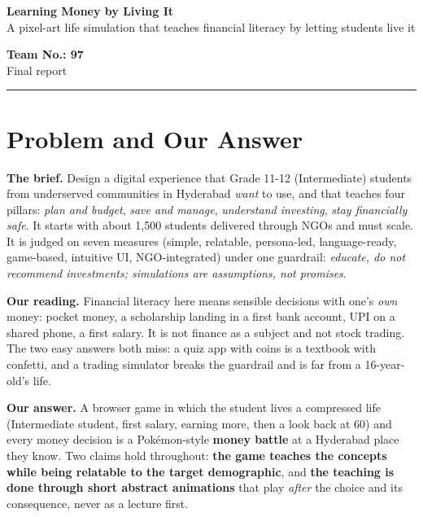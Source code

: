 \documentclass[10pt,a4paper]{article}
\begin{document}
\begin{minipage}[t]{0.70\textwidth}
{\LARGE\bfseries Learning Money by Living It}\\[1pt]
{\color{muted}A pixel-art life simulation that teaches financial literacy by letting students live it}
\end{minipage}\hfill
\begin{minipage}[t]{0.28\textwidth}\raggedleft
{\bfseries Team No.: 97}\\[1pt]
{\small\color{muted}Final report}
\end{minipage}

\vspace{3pt}
{\color{acc}\rule{\textwidth}{1.2pt}}
\vspace{-3pt}

\section{Problem and Our Answer}
\textbf{The brief.} Design a digital experience that Grade 11-12 (Intermediate) students from underserved communities in Hyderabad \emph{want} to use, and that teaches four pillars: \emph{plan and budget}, \emph{save and manage}, \emph{understand investing}, \emph{stay financially safe}. It starts with about 1,500 students delivered through NGOs and must scale. It is judged on seven measures (simple, relatable, persona-led, language-ready, game-based, intuitive UI, NGO-integrated) under one guardrail: \emph{educate, do not recommend investments; simulations are assumptions, not promises}.

\textbf{Our reading.} Financial literacy here means sensible decisions with one's \emph{own} money: pocket money, a scholarship landing in a first bank account, UPI on a shared phone, a first salary. It is not finance as a subject and not stock trading. The two easy answers both miss: a quiz app with coins is a textbook with confetti, and a trading simulator breaks the guardrail and is far from a 16-year-old's life.

\textbf{Our answer.} A browser game in which the student lives a compressed life (Intermediate student, first salary, earning more, then a look back at 60) and every money decision is a Pok\'emon-style \textbf{money battle} at a Hyderabad place they know. Two claims hold throughout: \textbf{the game teaches the concepts while being relatable to the target demographic}, and \textbf{the teaching is done through short abstract animations} that play \emph{after} the choice and its consequence, never as a lecture first.
\end{document}
